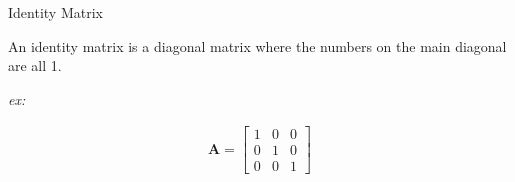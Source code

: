 Identity Matrix

\begin{solution}
An identity matrix is a diagonal matrix where the numbers on the main diagonal are all 1.

\emph{ex:}

\begin{align*}
    \boldsymbol{A} = \begin{bmatrix}
    1 & 0 & 0 \\ 0 & 1 & 0 \\ 0 & 0 & 1
    \end{bmatrix}
\end{align*}
\end{solution}